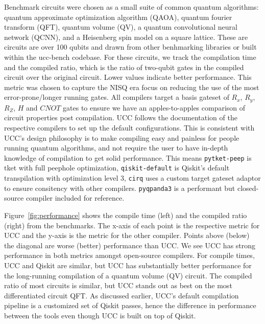 \documentclass[conference]{IEEEtran}
\begin{document}
Benchmark circuits were chosen as a small suite of common quantum algorithms: quantum approximate optimization algorithm (QAOA), quantum fourier transform (QFT), quantum volume (QV), a quantum convolutional neural network (QCNN), and a Heisenberg spin model on a square lattice. These are circuits are over 100 qubits and drawn from other benhmarking libraries \cite{Sawaya2024hamliblibraryof,benchpress_2025,qasmbench} or built within the ucc-bench codebase. For these circuits, we track the compilation time and the compiled ratio, which is the ratio of two-qubit gates in the compiled circuit over the original circuit. Lower values indicate better performance. This metric was chosen to capture the NISQ era focus on reducing the use of the most error-prone/longer running gates. All compilers target a basis gateset of $R_x$, $R_y$, $R_Z$, $H$ and $CNOT$ gates to ensure we have an apples-to-apples comparison of circuit properties post compilation. UCC follows the documentation of the respective compilers to set up the default configurations. This is consistent with UCC's design philosophy is to make compiling easy and painless for people running quantum algorithms, and not require the user to have in-depth knowledge of compilation to get solid performance. This means \texttt{pytket-peep} is tket with full peephole optimization, \texttt{qiskit-default} is Qiskit's default transpilation with optimization level 3, \texttt{cirq} uses a custom target gateset adaptor to ensure consitency with other compilers. \texttt{pyqpanda3} is a performant but closed-source compiler included for reference.

Figure~\ref{fig:performance} shows the compile time (left) and the compiled ratio (right) from the benchmarks. The x-axis of each point is the respective metric for UCC and the y-axis is the metric for the other compiler. Points above (below) the diagonal are worse (better) performance than UCC. We see UCC has strong performance in both metrics amongst open-source compilers. For compile times, UCC and Qiskit are similar, but UCC has substantially better performance for the long-running compilation of a quantum volume (QV) circuit. The compiled ratio of most circuits is similar, but UCC stands out as best on the most differentiated circuit QFT. As discussed earlier, UCC's default compilation pipeline is a customized set of Qiskit passes, hence the difference in performance between the tools even though UCC is built on top of Qiskit.

\end{document}
